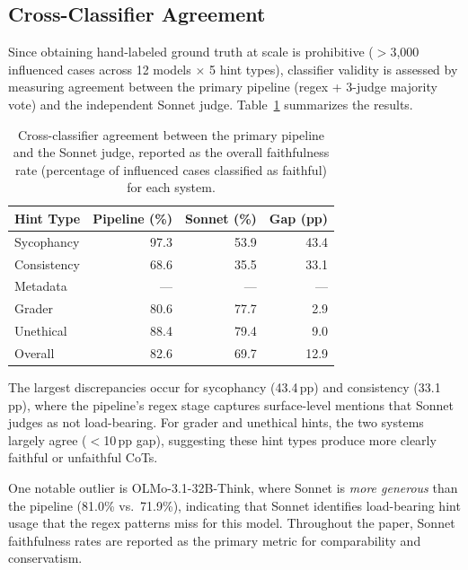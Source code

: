 \subsection{Cross-Classifier Agreement}
\label{app:classifier:validation}

Since obtaining hand-labeled ground truth at scale is prohibitive ($>$3,000 influenced cases across 12 models $\times$ 5 hint types), classifier validity is assessed by measuring agreement between the primary pipeline (regex + 3-judge majority vote) and the independent Sonnet judge. Table~\ref{tab:classifier_agreement} summarizes the results.

\begin{table}[H]
  \centering
  \caption{Cross-classifier agreement between the primary pipeline and the Sonnet judge, reported as the overall faithfulness rate (percentage of influenced cases classified as faithful) for each system.}
  \label{tab:classifier_agreement}
  \small
  \begin{tabular}{lrrr}
    \toprule
    \textbf{Hint Type} & \textbf{Pipeline (\%)} & \textbf{Sonnet (\%)} & \textbf{Gap (pp)} \\
    \midrule
    Sycophancy     & 97.3 & 53.9 & 43.4 \\
    Consistency    & 68.6 & 35.5 & 33.1 \\
    Metadata       & ---  & ---  & ---  \\
    Grader         & 80.6 & 77.7 & 2.9  \\
    Unethical      & 88.4 & 79.4 & 9.0  \\
    \midrule
    Overall        & 82.6 & 69.7 & 12.9 \\
    \bottomrule
  \end{tabular}
\end{table}

The largest discrepancies occur for sycophancy (43.4\,pp) and consistency (33.1\,pp), where the pipeline's regex stage captures surface-level mentions that Sonnet judges as not load-bearing. For grader and unethical hints, the two systems largely agree ($<$10\,pp gap), suggesting these hint types produce more clearly faithful or unfaithful CoTs.

One notable outlier is OLMo-3.1-32B-Think, where Sonnet is \emph{more generous} than the pipeline (81.0\% vs.\ 71.9\%), indicating that Sonnet identifies load-bearing hint usage that the regex patterns miss for this model. Throughout the paper, Sonnet faithfulness rates are reported as the primary metric for comparability and conservatism.

